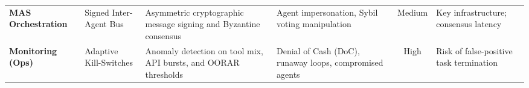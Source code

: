 \begin{table}[t]
\begin{tabularx}{\columnwidth}{l p{2.1cm} X X c p{1.8cm}}
\textbf{MAS Orchestration} & Signed Inter-Agent Bus & Asymmetric cryptographic message signing and Byzantine consensus & Agent impersonation, Sybil voting manipulation & Medium & Key infrastructure; consensus latency \\
\textbf{Monitoring (Ops)} & Adaptive Kill-Switches & Anomaly detection on tool mix, API bursts, and OORAR thresholds & Denial of Cash (DoC), runaway loops, compromised agents & High & Risk of false-positive task termination \\
\bottomrule
\end{tabularx}
\end{table}
